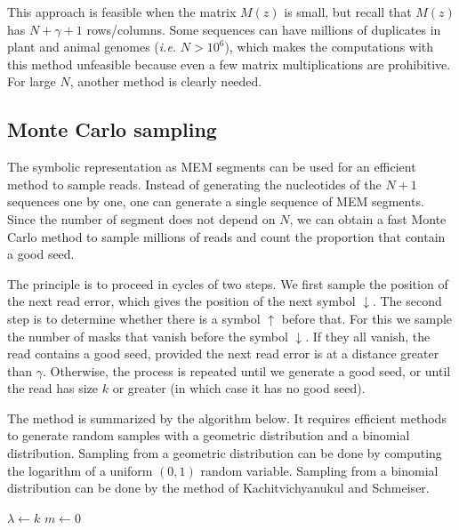 \documentclass{article}
\begin{document}
This approach is feasible when the matrix $M(z)$ is small, but recall that
$M(z)$ has $N+\gamma+1$ rows/columns. Some sequences can have millions of
duplicates in plant and animal genomes (\textit{i.e.} $N > 10^6$), which
makes the computations with this method unfeasible because even a few
matrix multiplications are prohibitive. For large $N$, another method is
clearly needed.


\subsection{Monte Carlo sampling}
\label{sec:montecarlo}

The symbolic representation as MEM segments can be used for an efficient
method to sample reads. Instead of generating the nucleotides of the $N+1$
sequences one by one, one can generate a single sequence of MEM segments.
Since the number of segment does not depend on $N$, we can obtain a fast
Monte Carlo method to sample millions of reads and count the proportion
that contain a good seed.

The principle is to proceed in cycles of two steps. We first sample the
position of the next read error, which gives the position of the next
symbol $\downarrow$. The second step is to determine whether there is a
symbol $\uparrow$ before that. For this we sample the number of masks that
vanish before the symbol $\downarrow$. If they all vanish, the read
contains a good seed, provided the next read error is at a distance
greater than $\gamma$. Otherwise, the process is repeated until we
generate a good seed, or until the read has size $k$ or greater (in which
case it has no good seed).

The method is summarized by the algorithm below. It requires efficient
methods to generate random samples with a geometric distribution and a
binomial distribution. Sampling from a geometric distribution can be done
by computing the logarithm of a uniform $(0,1)$ random variable. Sampling
from a binomial distribution can be done by the method of
Kachitvichyanukul and Schmeiser\cite{kachitvichyanukul1988binomial}.

\begin{algorithm}[H]
\label{alg:mcmc}
\SetAlgoLined
{}
  $\lambda \leftarrow k$ 
  $m \leftarrow 0$ 
\end{algorithm}
\end{document}
